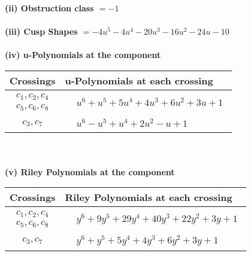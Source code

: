 \documentclass[1p]{elsarticle_modified}
\theoremstyle{definition}
\begin{document}
\flushleft \textbf{(ii) Obstruction class $= -1$}\\~\\
\flushleft \textbf{(iii) Cusp Shapes $= -4 u^5-4 u^4-20 u^3-16 u^2-24 u-10$}\\~\\
\newpage\renewcommand{\arraystretch}{1}
\flushleft \textbf{(iv) u-Polynomials at the component}\newline \\
\begin{tabular}{m{50pt}|m{274pt}}
Crossings & \hspace{64pt}u-Polynomials at each crossing \\
\hline $$\begin{aligned}c_{1},c_{2},c_{4}\\c_{5},c_{6},c_{8}\end{aligned}$$&$\begin{aligned}
&u^6+u^5+5 u^4+4 u^3+6 u^2+3 u+1
\end{aligned}$\\
\hline $$\begin{aligned}c_{3},c_{7}\end{aligned}$$&$\begin{aligned}
&u^6- u^5+u^4+2 u^2- u+1
\end{aligned}$\\
\hline
\end{tabular}\\~\\
\newpage\renewcommand{\arraystretch}{1}
\flushleft \textbf{(v) Riley Polynomials at the component}\newline \\
\begin{tabular}{m{50pt}|m{274pt}}
Crossings & \hspace{64pt}Riley Polynomials at each crossing \\
\hline $$\begin{aligned}c_{1},c_{2},c_{4}\\c_{5},c_{6},c_{8}\end{aligned}$$&$\begin{aligned}
&y^6+9 y^5+29 y^4+40 y^3+22 y^2+3 y+1
\end{aligned}$\\
\hline $$\begin{aligned}c_{3},c_{7}\end{aligned}$$&$\begin{aligned}
&y^6+y^5+5 y^4+4 y^3+6 y^2+3 y+1
\end{aligned}$\\
\hline
\end{tabular}\\~\\
\end{document}
